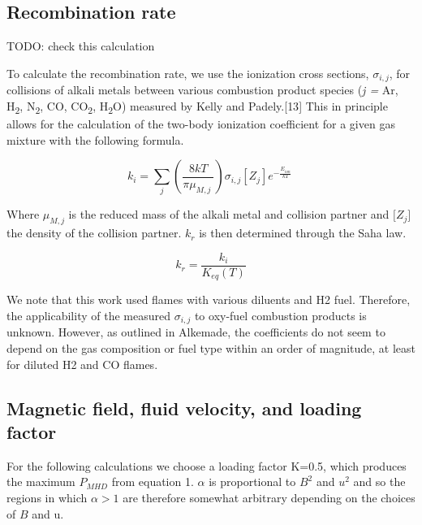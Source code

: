 \hypertarget{recombination-rate}{%
\subsection{Recombination rate}\label{recombination-rate}}

TODO: check this calculation

To calculate the recombination rate, we use the ionization cross sections, \(\sigma_{i,j}\), for collisions of alkali metals between various combustion product species (\emph{j =} Ar, H\textsubscript{2}, N\textsubscript{2}, CO, CO\textsubscript{2}, H\textsubscript{2}O) measured by Kelly and Padely.{[}13{]} This in principle allows for the calculation of the two-body ionization coefficient for a given gas mixture with the following formula.

\begin{equation}
k_{i} = \sum_{j}^{}{\left( \frac{8kT}{\pi\mu_{M,j}\ } \right)\sigma_{i,j}\left\lbrack Z_{j} \right\rbrack e^{- \frac{E_{ion}}{kT}}\ }
\end{equation}


Where \(\mu_{M,j}\) is the reduced mass of the alkali metal and collision partner and \(\lbrack Z_{j}\rbrack\) the density of the collision partner. \(k_{r}\) is then determined through the Saha law.

\begin{equation}
k_{r} = \frac{k_{i}}{K_{eq}(T)}
\end{equation}

We note that this work used flames with various diluents and H2 fuel. Therefore, the applicability of the measured \(\sigma_{i,j}\) to oxy-fuel combustion products is unknown. However, as outlined in Alkemade, the coefficients do not seem to depend on the gas composition or fuel type within an order of magnitude, at least for diluted H2 and CO flames.



\hypertarget{magnetic-field-fluid-velocity-and-loading-factor}{%
\subsection{Magnetic field, fluid velocity, and loading factor}\label{magnetic-field-fluid-velocity-and-loading-factor}}

For the following calculations we choose a loading factor K=0.5, which produces the maximum \(P_{MHD}\) from equation 1. \(\alpha\) is proportional to \(B^{2}\) and \(u^{2}\) and so the regions in which \(\alpha > 1\) are therefore somewhat arbitrary depending on the choices of \(B\) and u.

